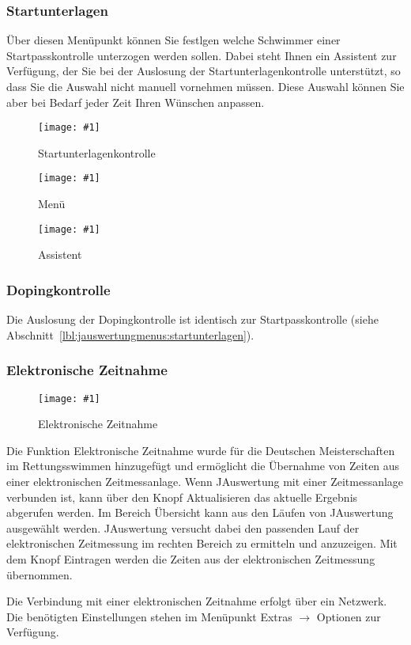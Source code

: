 \documentclass[11pt,a4paper,twoside,ngerman]{article}
\newcommand{\hsmimage}[3]{\begin{figure}[!ht]\centering\texttt{[image: \#1]}\caption{#3}\end{figure}}
\begin{document}
\subsubsection*{Startunterlagen}
\label{lbl:jauswertungmenus:startunterlagen}Über diesen Menüpunkt können Sie festlgen welche Schwimmer einer Startpasskontrolle unterzogen werden sollen. Dabei steht Ihnen ein Assistent zur Verfügung, der Sie bei der Auslosung der Startunterlagenkontrolle unterstützt, so dass Sie die Auswahl nicht manuell vornehmen müssen. Diese Auswahl können Sie aber bei Bedarf jeder Zeit Ihren Wünschen anpassen.


\hsmimage{pics/startunterlagen-menu}{.15\textwidth}{Startunterlagenkontrolle}

\hsmimage{pics/startunterlagen-menu}{.15\textwidth}{Menü}

\hsmimage{pics/startunterlagen-assistent}{.50\textwidth}{Assistent}

\subsubsection*{Dopingkontrolle}
\label{lbl:jauswertungmenus:dopingkontrolle}Die Auslosung der Dopingkontrolle ist identisch zur Startpasskontrolle (siehe Abschnitt~\ref{lbl:jauswertungmenus:startunterlagen}).


\subsubsection*{Elektronische Zeitnahme}

\hsmimage{pics/elektronische-zeitnahme}{.76\textwidth}{Elektronische Zeitnahme}
Die Funktion \glqq{}Elektronische Zeitnahme\grqq{} wurde für die \glqq{}Deutschen Meisterschaften im Rettungsswimmen\grqq{} hinzugefügt und ermöglicht die Übernahme von Zeiten aus einer elektronischen Zeitmessanlage. Wenn JAuswertung mit einer Zeitmessanlage verbunden ist, kann über den Knopf \glqq{}Aktualisieren\grqq{} das aktuelle Ergebnis abgerufen werden. Im Bereich Übersicht kann aus den Läufen von JAuswertung ausgewählt werden. JAuswertung versucht dabei den passenden Lauf der elektronischen Zeitmessung im rechten Bereich zu ermitteln und anzuzeigen. Mit dem Knopf \glqq{}Eintragen\grqq{} werden die Zeiten aus der elektronischen Zeitmessung übernommen.

Die Verbindung mit einer elektronischen Zeitnahme erfolgt über ein Netzwerk. Die benötigten Einstellungen stehen im Menüpunkt Extras \ensuremath{\rightarrow} Optionen zur Verfügung.
\end{document}

